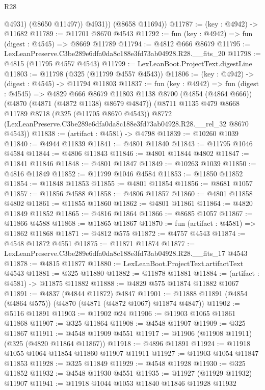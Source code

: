 \begin{lexlean}{R28}
\begin{coremodule}
              @4931)
            (@8650 @11497))
          @4931))
      (@8658 @11694))
@11787 := (key : @4942) -> @11682
@11789 := @11701 @8670 @4543
@11792 := fun (key : @4942) => fun (digest : @4545) => @8669 @11789
@11794 := @4812 @666 @8679
@11795 := LexLeanPreserve.C3be289e6dfa0da8c188e3fd73ab04928.R28.__fits_20
@11798 := @4815 (@11795 @4557 @4543)
@11799 := LexLeanBoot.ProjectText.digestLine
@11803 := @11798 (@325 (@11799 @4557 @4543))
@11806 := (key : @4942) -> (digest : @4545) -> @11794 @11803
@11837 := fun (key : @4942) =>
  fun (digest : @4545) =>
  @4829
    @666
    @8679
    @11803
    @1138
    @8700
    (@4854 (@4864 @666))
    (@4870 (@4871 (@4872 @1138) @8679 @4847))
    (@8711
      @1135
      @479
      @8668
      @11789
      @8718
      (@325 (@11705 @8670 @4543))
      @8772
      (LexLeanPreserve.C3be289e6dfa0da8c188e3fd73ab04928.R28.__rel_32 @8670 @4543))
@11838 := (artifact : @4581) -> @4798
@11839 := @10260 @1039
@11840 := @4944 @11839
@11841 := @4801 @11840
@11843 := @11795 @1046 @4584
@11844 := @4806 @11843
@11846 := @4801 @11844 @4802
@11847 := @11841 @11846
@11848 := @4801 @11847
@11849 := @10263 @1039
@11850 := @4816 @11849
@11852 := @11799 @1046 @4584
@11853 := @11850 @11852
@11854 := @11848 @11853
@11855 := @4801 @11854
@11856 := @8681 @1057
@11857 := @11856 @4588
@11858 := @4806 @11857
@11860 := @4801 @11858 @4802
@11861 := @11855 @11860
@11862 := @4801 @11861
@11864 := @4820 @11849 @11852
@11865 := @4816 @11864
@11866 := @8685 @1057
@11867 := @11866 @4588
@11868 := @11865 @11867
@11870 := fun (artifact : @4581) => @11862 @11868
@11871 := @4812 @575
@11872 := @4757 @4543
@11874 := @4548 @11872 @4551
@11875 := @11871 @11874
@11877 := LexLeanPreserve.C3be289e6dfa0da8c188e3fd73ab04928.R28.__fits_17 @4543
@11878 := @4815 @11877
@11880 := LexLeanBoot.ProjectText.artifactText @4543
@11881 := @325 @11880
@11882 := @11878 @11881
@11884 := (artifact : @4581) -> @11875 @11882
@11888 := @4829 @575 @11874 @11882 @1067
@11891 := @4837 (@4844 @11872) @4847
@11901 := @11888 @11891 (@4854 (@4864 @575)) (@4870 (@4871 (@4872 @1067) @11874 @4847))
@11902 := @5116 @11891
@11903 := @11902 @24
@11906 := @11903 @1065 @11861 @11868
@11907 := @325 @11864
@11908 := @4548 @11907
@11909 := @325 @11867
@11911 := @4548 @11909 @4551
@11917 := @11906 (@11908 @11911) (@325 (@4820 @11864 @11867))
@11918 := @4896 @11891
@11924 := @11918 @1055 @1064 @11854 @11860 @11907 @11911
@11927 := @11903 @1054 @11847 @11853
@11928 := @325 @11849
@11929 := @4548 @11928
@11930 := @325 @11852
@11932 := @4548 @11930 @4551
@11935 := @11927 (@11929 @11932) @11907
@11941 := @11918 @1044 @1053 @11840 @11846 @11928 @11932

\end{coremodule}
\end{lexlean}
